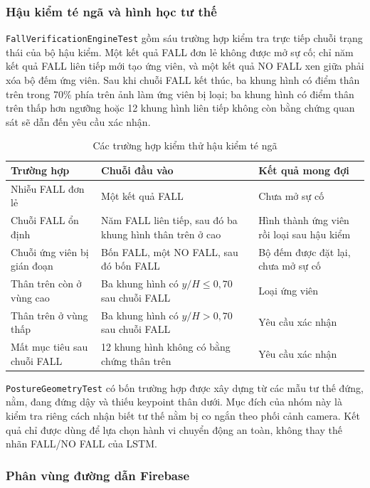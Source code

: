 \subsubsection{Hậu kiểm té ngã và hình học tư thế}

\texttt{FallVerificationEngineTest} gồm sáu trường hợp kiểm tra trực tiếp chuỗi trạng thái của bộ hậu kiểm. Một kết quả FALL đơn lẻ không được mở sự cố; chỉ năm kết quả FALL liên tiếp mới tạo ứng viên, và một kết quả NO FALL xen giữa phải xóa bộ đếm ứng viên. Sau khi chuỗi FALL kết thúc, ba khung hình có điểm thân trên trong 70\% phía trên ảnh làm ứng viên bị loại; ba khung hình có điểm thân trên thấp hơn ngưỡng hoặc 12 khung hình liên tiếp không còn bằng chứng quan sát sẽ dẫn đến yêu cầu xác nhận.

\begin{table}[htbp]
\centering
\caption{Các trường hợp kiểm thử hậu kiểm té ngã}
\label{tab:fall_unit_tests}
\small
\begin{tabularx}{\textwidth}{|p{4.4cm}|X|p{3.2cm}|}
\hline
\textbf{Trường hợp} & \textbf{Chuỗi đầu vào} & \textbf{Kết quả mong đợi} \\
\hline
Nhiễu FALL đơn lẻ & Một kết quả FALL & Chưa mở sự cố \\
\hline
Chuỗi FALL ổn định & Năm FALL liên tiếp, sau đó ba khung hình thân trên ở cao & Hình thành ứng viên rồi loại sau hậu kiểm \\
\hline
Chuỗi ứng viên bị gián đoạn & Bốn FALL, một NO FALL, sau đó bốn FALL & Bộ đếm được đặt lại, chưa mở sự cố \\
\hline
Thân trên còn ở vùng cao & Ba khung hình có $y/H\leq0,70$ sau chuỗi FALL & Loại ứng viên \\
\hline
Thân trên ở vùng thấp & Ba khung hình có $y/H>0,70$ sau chuỗi FALL & Yêu cầu xác nhận \\
\hline
Mất mục tiêu sau chuỗi FALL & 12 khung hình không có bằng chứng thân trên & Yêu cầu xác nhận \\
\hline
\end{tabularx}
\end{table}

\texttt{PostureGeometryTest} có bốn trường hợp được xây dựng từ các mẫu tư thế đứng, nằm, đang đứng dậy và thiếu keypoint thân dưới. Mục đích của nhóm này là kiểm tra riêng cách nhận biết tư thế nằm bị co ngắn theo phối cảnh camera. Kết quả chỉ được dùng để lựa chọn hành vi chuyển động an toàn, không thay thế nhãn FALL/NO FALL của LSTM.

\subsubsection{Phân vùng đường dẫn Firebase}

